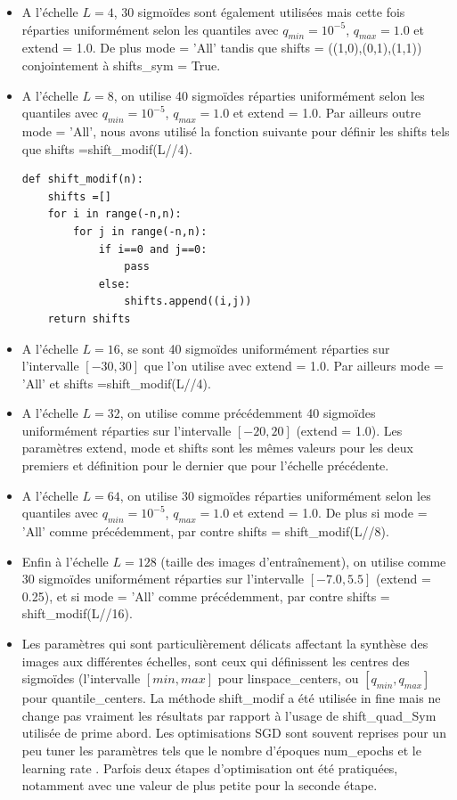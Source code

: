 \documentclass[12pt,twoside]{article}
\newcommand{\itemb}{\item[$\bullet$]}
\begin{document}
\begin{itemize}
%
\itemb A l'échelle $L=4$,  30 sigmoïdes sont également utilisées mais cette fois réparties uniformément selon les quantiles avec $q_{min}=10^{-5}$, $q_{max}=1.0$ et \textsf{extend = 1.0}. De plus \textsf{mode = 'All'} tandis que \textsf{shifts = ((1,0),(0,1),(1,1))} conjointement à \textsf{shifts\_sym = True}.
%
\itemb A l'échelle $L=8$, on utilise 40 sigmoïdes réparties uniformément selon les quantiles avec $q_{min}=10^{-5}$, $q_{max}=1.0$ et \textsf{extend = 1.0}. Par ailleurs outre \textsf{mode = 'All'}, nous avons utilisé la fonction suivante pour définir les shifts tels que 
\textsf{shifts =shift\_modif(L//4)}.
\begin{lstlisting}[language=iPython]
def shift_modif(n):
    shifts =[]
    for i in range(-n,n):
        for j in range(-n,n):
            if i==0 and j==0:
                pass
            else:
                shifts.append((i,j))
    return shifts
\end{lstlisting}
%
\itemb A l'échelle $L=16$, se sont 40 sigmoïdes uniformément réparties sur l'intervalle $[-30, 30]$ que l'on utilise avec \textsf{extend = 1.0}. Par ailleurs \textsf{mode = 'All'} et 
\textsf{shifts =shift\_modif(L//4)}.
%
\itemb A l'échelle $L=32$, on utilise comme précédemment 40 sigmoïdes uniformément réparties sur l'intervalle $[-20, 20]$ (\textsf{extend = 1.0}). Les paramètres \textsf{extend}, \textsf{mode} et \textsf{shifts} sont les mêmes valeurs pour les deux premiers et définition pour le dernier que pour l'échelle précédente.
%
\itemb A l'échelle $L=64$, on utilise 30 sigmoïdes réparties uniformément selon les quantiles avec $q_{min}=10^{-5}$, $q_{max}=1.0$ et \textsf{extend = 1.0}. De plus si \textsf{mode = 'All'} comme précédemment, par contre \textsf{shifts = shift\_modif(L//8)}.
%
\itemb Enfin à l'échelle $L=128$ (taille des images d'entraînement), on utilise comme  30 sigmoïdes uniformément réparties sur l'intervalle $[-7.0, 5.5]$ (\textsf{extend = 0.25}), et si \textsf{mode = 'All'} comme précédemment, par contre \textsf{shifts = shift\_modif(L//16)}.
%
\itemb Les paramètres qui sont particulièrement délicats affectant la synthèse des images aux différentes échelles, sont ceux qui définissent les centres des sigmoïdes (l'intervalle $[min,max]$ pour \textsf{linspace\_centers}, ou $[q_{min},q_{max}]$ pour \textsf{quantile\_centers}. La méthode \textsf{shift\_modif} a été utilisée in fine mais ne change pas vraiment les résultats par rapport à l'usage de \textsf{shift\_quad\_Sym} utilisée de prime abord. Les optimisations SGD sont souvent reprises pour un peu tuner les paramètres tels que le nombre d'époques \textsf{num\_epochs} et le learning rate . Parfois deux étapes d'optimisation ont été pratiquées, notamment avec une valeur de   plus petite pour la seconde étape.
\end{itemize}
%
\end{document}
